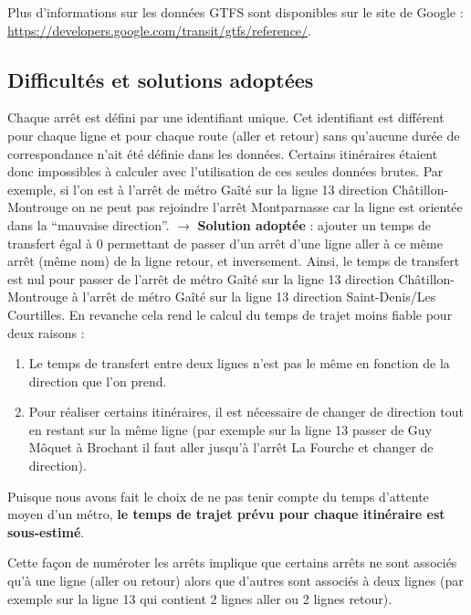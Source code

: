 \documentclass[,french]{article}
\begin{document}
Plus d'informations sur les données GTFS sont disponibles sur le site de
Google : \url{https://developers.google.com/transit/gtfs/reference/}.

\hypertarget{difficultuxe9s-et-solutions-adoptuxe9es}{%
\subsection{Difficultés et solutions
adoptées}\label{difficultuxe9s-et-solutions-adoptuxe9es}}

Chaque arrêt est défini par une identifiant unique. Cet identifiant est
différent pour chaque ligne et pour chaque route (aller et retour) sans
qu'aucune durée de correspondance n'ait été définie dans les données.
Certains itinéraires étaient donc impossibles à calculer avec
l'utilisation de ces seules données brutes. Par exemple, si l'on est à
l'arrêt de métro Gaîté sur la ligne 13 direction Châtillon-Montrouge on
ne peut pas rejoindre l'arrêt Montparnasse car la ligne est orientée
dans la ``mauvaise direction''. \(\rightarrow\) \textbf{Solution
adoptée} : ajouter un temps de transfert égal à 0 permettant de passer
d'un arrêt d'une ligne aller à ce même arrêt (même nom) de la ligne
retour, et inversement. Ainsi, le temps de transfert est nul pour passer
de l'arrêt de métro Gaîté sur la ligne 13 direction Châtillon-Montrouge
à l'arrêt de métro Gaîté sur la ligne 13 direction Saint-Denis/Les
Courtilles. En revanche cela rend le calcul du temps de trajet moins
fiable pour deux raisons :

\begin{enumerate}
\def\labelenumi{\arabic{enumi}.}
\item
  Le temps de transfert entre deux lignes n'est pas le même en fonction
  de la direction que l'on prend.
\item
  Pour réaliser certains itinéraires, il est nécessaire de changer de
  direction tout en restant sur la même ligne (par exemple sur la ligne
  13 passer de Guy Môquet à Brochant il faut aller jusqu'à l'arrêt La
  Fourche et changer de direction). 
\end{enumerate}

Puisque nous avons fait le choix de ne pas tenir compte du temps
d'attente moyen d'un métro, \textbf{le temps de trajet prévu pour chaque
itinéraire est sous-estimé}.

Cette façon de numéroter les arrêts implique que certains arrêts ne sont
associés qu'à une ligne (aller ou retour) alors que d'autres sont
associés à deux lignes (par exemple sur la ligne 13 qui contient 2
lignes aller ou 2 lignes retour).
\end{document}
